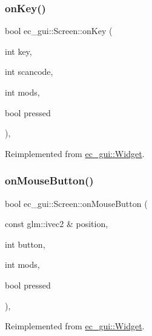\subsubsection{\texorpdfstring{on\+Key()}{onKey()}}
{\footnotesize\ttfamily bool ec\+\_\+gui\+::\+Screen\+::on\+Key (\begin{DoxyParamCaption}\item[{int}]{key,  }\item[{int}]{scancode,  }\item[{int}]{mods,  }\item[{bool}]{pressed }\end{DoxyParamCaption})\hspace{0.3cm}{\ttfamily [override]}, {\ttfamily [virtual]}}



Reimplemented from \mbox{\hyperlink{classec__gui_1_1_widget_a360664ea02b08a96e19c4c1cbdcd0fc8}{ec\+\_\+gui\+::\+Widget}}.

\mbox{\label{classec__gui_1_1_screen_a52e91a7c1d03514256956b72860f52ff}} 
\subsubsection{\texorpdfstring{on\+Mouse\+Button()}{onMouseButton()}}
{\footnotesize\ttfamily bool ec\+\_\+gui\+::\+Screen\+::on\+Mouse\+Button (\begin{DoxyParamCaption}\item[{const glm\+::ivec2 \&}]{position,  }\item[{int}]{button,  }\item[{int}]{mods,  }\item[{bool}]{pressed }\end{DoxyParamCaption})\hspace{0.3cm}{\ttfamily [override]}, {\ttfamily [virtual]}}



Reimplemented from \mbox{\hyperlink{classec__gui_1_1_widget_a824efc45fa4df40d7e1e94f08e6363cf}{ec\+\_\+gui\+::\+Widget}}.

\mbox{\label{classec__gui_1_1_screen_aac1958cf78cf6194ffcf347fa49ad65a}} 

